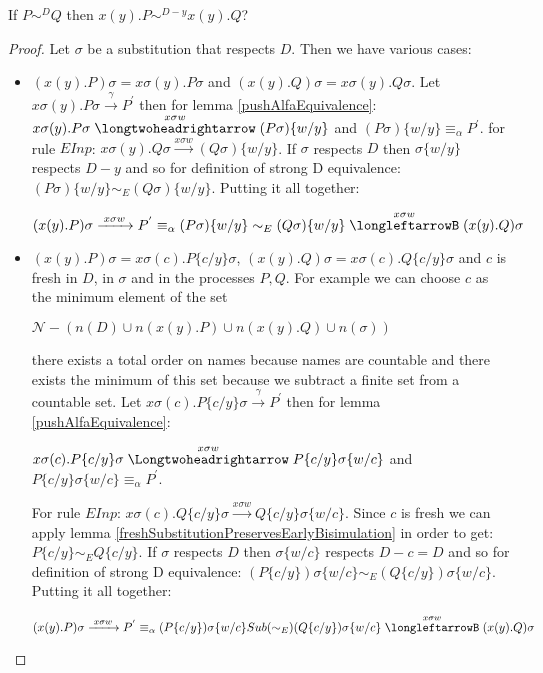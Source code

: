 \begin{lemma}\label{strongDEquivalencePreservedByInput}
  If $P \sim^{D} Q$ then $x(y).P \sim^{D-y} x(y).Q$?
  \begin{proof}
    Let $\sigma$ be a substitution that respects $D$. Then we have various cases:
    \begin{itemize}
      \item 
	$(x(y).P)\sigma = x\sigma(y).P\sigma$ and $(x(y).Q)\sigma = x\sigma(y).Q\sigma$. Let $x\sigma (y).P\sigma \xrightarrow{\gamma} P^{'}$ then for lemma \ref{pushAlfaEquivalence}: $x\sigma (y).P\sigma \stackrel{x\sigma w}{\longtwoheadrightarrow} (P\sigma)\{w/y\}$ and $(P\sigma)\{w/y\} \equiv_{\alpha} P^{'}$. for rule $EInp$: $x\sigma (y).Q\sigma \xrightarrow{x\sigma w} (Q\sigma)\{w/y\}$. If $\sigma$ respects $D$ then $\sigma\{w/y\}$ respects $D-y$ and so for definition of strong D equivalence: $(P\sigma)\{w/y\} \sim_{E} (Q\sigma)\{w/y\}$. Putting it all together:
	\begin{center}
	  $(x(y).P)\sigma \xrightarrow{\; x\sigma w \;} P^{'} \equiv_{\alpha} (P\sigma)\{w/y\} \sim_{E} (Q\sigma)\{w/y\} \stackrel{x\sigma w}{\longleftarrowB} (x(y).Q)\sigma$
	\end{center}
      \item
	$(x(y).P)\sigma = x\sigma(c).P\{c/y\}\sigma$, $(x(y).Q)\sigma = x\sigma(c).Q\{c/y\}\sigma$ and $c$ is fresh in $D$, in $\sigma$ and in the processes $P,Q$. For example we can choose $c$ as the minimum element of the set
	\begin{center}
	  $\mathcal{N}-(n(D) \cup n(x(y).P) \cup n(x(y).Q) \cup n(\sigma))$
	\end{center}
	there exists a total order on names because names are countable and there exists the minimum of this set because we subtract a finite set from a countable set.  Let $x\sigma(c).P\{c/y\}\sigma \xrightarrow{\gamma} P^{'}$ then for lemma \ref{pushAlfaEquivalence}: 
	\begin{center}
	  $x\sigma(c).P\{c/y\}\sigma \stackrel{x\sigma w}{\Longtwoheadrightarrow} P\{c/y\}\sigma \{w/c\}$ and $P\{c/y\}\sigma \{w/c\}\equiv_{\alpha} P^{'}$. 
	\end{center}
	For rule $EInp$: $x\sigma(c).Q\{c/y\}\sigma \xrightarrow{x\sigma w} Q\{c/y\}\sigma\{w/c\}$. Since $c$ is fresh we can apply lemma \ref{freshSubstitutionPreservesEarlyBisimulation} in order to get: $P\{c/y\} \sim_{E} Q\{c/y\}$. If $\sigma$ respects $D$ then $\sigma\{w/c\}$ respects $D-c=D$ and so for definition of strong D equivalence: $(P\{c/y\})\sigma\{w/c\} \sim_{E} (Q\{c/y\})\sigma\{w/c\}$. Putting it all together:
	\begin{center}
	  $(x(y).P)\sigma \xrightarrow{\; x\sigma w \;} P^{'} \equiv_{\alpha} (P\{c/y\})\sigma \{w/c\} Sub(\sim_{E}) (Q\{c/y\})\sigma\{w/c\} \stackrel{x\sigma w}{\longleftarrowB} (x(y).Q)\sigma$
	\end{center}
    \end{itemize}

  \end{proof}
\end{lemma}


